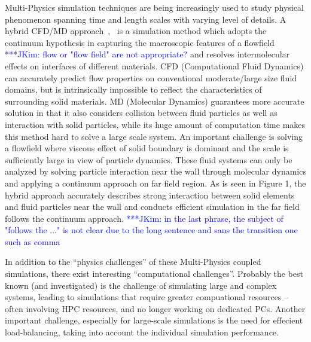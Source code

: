 \documentclass[a4paper]{article}
\newcommand{\jkimnote}[1]{ {\textcolor{blue} { ***JKim: #1 }}}
\begin{document}
Multi-Physics simulation techniques are being increasingly used to study physical phenomenon spanning time and length scales with varying level of details.  A hybrid CFD/MD approach~\cite{Nie:2004},~\cite{Yen:2007} is a simulation method which adopts the continuum hypothesis in capturing the macroscopic features of a flowfield\jkimnote{flow or "flow field" are not appropriate?} and resolves intermolecular effects on interfaces of different materials. CFD (Computational Fluid Dynamics) can accurately predict flow properties on conventional moderate/large size fluid domains, but is intrinsically impossible to reflect the characteristics of surrounding solid materials. MD (Molecular Dynamics) guarantees more accurate solution in that it also considers collision between fluid particles as well as interaction with solid particles, while its huge amount of computation time makes this method hard to solve a large scale system. An important challenge is solving a flowfield where viscous effect of solid boundary is dominant and the scale is sufficiently large in view of particle dynamics. These fluid systems can only be analyzed by solving particle interaction near the wall through molecular dynamics and applying a continuum approach on far field region. As is seen in Figure 1, the hybrid approach accurately describes strong interaction between solid elements and fluid particles near the wall and conducts efficient simulation in the far field follows the continuum approach.\jkimnote{in the last phrase, the subject of "follows the ..." is not clear due to the long sentence and sans the transition one such as comma}

In addition to the ``physics challenges'' of these Multi-Physics coupled simulations, there exist interesting ``computational challenges''. Probably the best known (and investigated) is the challenge of simulating large and complex systems, leading to simulations that require greater compuational resources -- often involving HPC resources, and no longer working on dedicated PCs. Another important challenge, especially for large-scale simulations is the need for effecient load-balancing, taking into account the individual simulation performance.
\end{document}
